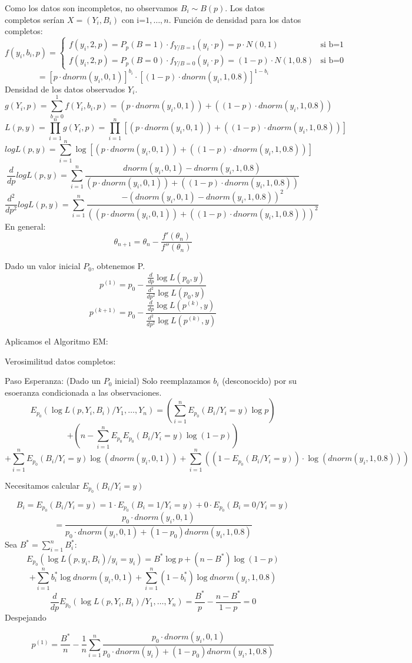\newpage

Como los datos son incompletos, no observamos $B_i \sim B(p)$. Los datos completos serían $X=(Y_i,B_i)$ con i=$1,\dots,n$.
Función de densidad para los datos completos:
\[
f(y_i,b_i,p)=\left\{
    \begin{matrix}
        f(y_i,2,p)=P_p(B=1) \cdot f_{Y/B=1}(y_i \cdot p)= p \cdot N(0,1) & \text{si b=1}\\
        f(y_i,2,p)=P_p(B=0) \cdot f_{Y/B=0}(y_i \cdot p)= (1-p) \cdot N(1,0.8) & \text{si b=0}
    \end{matrix}
\right.\
\]
\[
=[p \cdot dnorm(y_i,0,1)]^{b_i} \cdot [(1-p) \cdot dnorm(y_i,1,0.8)]^{1-b_i}
\]
Densidad de los datos observados $Y_i$.
\[
g(Y_i,p)=\sum_{b=0}^{1} f(Y_i,b_i,p)=(p \cdot dnorm(y_i,0,1)) + ((1-p) \cdot dnorm(y_i,1,0.8))
\]
\[
L(p,y)=\prod_{i=1}^{n} g(Y_i,p)=\prod_{i=1}^{n} [(p \cdot dnorm(y_i,0,1)) + ((1-p) \cdot dnorm(y_i,1,0.8))]
\]
\[
log L(p,y)=\sum_{i=1}^{n} \log [(p \cdot dnorm(y_i,0,1)) + ((1-p) \cdot dnorm(y_i,1,0.8))]
\]
\[
\frac{d}{dp} log L(p,y)= \sum_{i=1}^{n} \frac{dnorm(y_i,0,1)-dnorm(y_i,1,0.8)}{(p \cdot dnorm(y_i,0,1)) + ((1-p) \cdot dnorm(y_i,1,0.8))}
\]
\[
\frac{d^2}{dp^2} log L(p,y)= \sum_{i=1}^{n} \frac{-(dnorm(y_i,0,1)-dnorm(y_i,1,0.8))^2}{((p \cdot dnorm(y_i,0,1)) + ((1-p) \cdot dnorm(y_i,1,0.8)))^2}
\]
En general:
\[
\theta_{n+1}=\theta_n
-\frac{f'(\theta_n)}{f''(\theta_n)}\]

Dado un valor inicial $P_0$, obtenemos P.
\[
p^{(1)}=p_0-\frac{\frac{d}{dp}\log L(p_0,y)}{\frac{d^2}{dp^2}\log L(p_0,y)}
\]
\[
p^{(k+1)}=p_0-\frac{\frac{d}{dp}\log L(p^{(k)},y)}{\frac{d^2}{dp^2}\log L(p^{(k)},y)}
\]

Aplicamos el Algoritmo EM:

Verosimilitud datos completos:

Paso Esperanza: (Dado un $P_0$ inicial) Solo reemplazamos $b_i$ (desconocido) por su esoeranza condicionada a las observaciones.
\[
E_{p_0}(\log L(p,Y_i,B_i)/Y_1,\dots,Y_n)=(\sum_{i=1}^{n} E_{p_0}(B_i/Y_i=y) \log p)
\]\[
+(n-\sum_{i=1}^{n} E_{p_0} E_{p_0}(B_i/Y_i=y) \log (1-p))
\]\[
+\sum_{i=1}^{n} E_{p_0}(B_i/Y_i=y) \log(dnorm(y_i,0,1))+ \sum_{i=1}^{n} ((1-E_{p_0}(B_i/Y_i=y))\cdot \log(dnorm(y_i,1,0.8)))
\]

Necesitamos calcular $E_{p_0}(B_i/Y_i=y)$

\[
B_i=E_{p_0}(B_i/Y_i=y)=1\cdot E_{p_0}(B_i=1/Y_i=y)+0 \cdot E_{p_0}(B_i=0/Y_i=y)
\]
\[
=\frac{p_0 \cdot dnorm(y_i,0,1)}{p_0 \cdot dnorm(y_i,0,1)+(1-p_0)dnorm(y_i,1,0.8)}
\]
Sea $B^*=\sum_{i=1}^{n} B_i^*$:
\[
E_{p_0}(\log L(p,y_i,B_i)/y_i=y_i)=B^* \log p + (n-B^*) \log (1-p) 
\]\[+ \sum_{i=1}^{n} b_i^* \log dnorm(y_i,0,1)
+\sum_{i=1}^{n}(1-b_i^*) \log dnorm(y_i,1,0.8)
\]
\[
\frac{d}{dp} E_{p_0} (\log L(p,Y_i,B_i)/Y_1,\dots,Y_n)=\frac{B^*}{p}-\frac{n-B^*}{1-p}=0
\]
Despejando

\[
p^{(1)}=\frac{B^*}{n}-\frac{1}{n} \sum_{i=1}^{n} \frac{p_0 \cdot dnorm(y_i,0,1)}{p_0 \cdot dnorm(y_i)+(1-p_0)dnorm(y_i,1,0.8)}
\]


